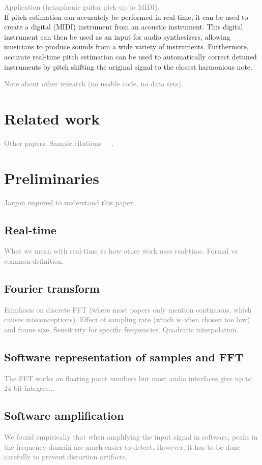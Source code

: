 \documentclass[10pt,twocolumn]{article}
\begin{document}
\textcolor{gray}{Application (hexaphonic guitar pick-up to MIDI).}\\
If pitch estimation can accurately be performed in real-time, it can be used to create a digital (MIDI) instrument from an acoustic instrument. This digital instrument can then be used as an input for audio synthesizers, allowing musicians to produce sounds from a wide variety of instruments. Furthermore, accurate real-time pitch estimation can be used to automatically correct detuned instruments by pitch shifting the original signal to the closest harmonious note.

\textcolor{gray}{Note about other research (no usable code, no data sets).}


\section{Related work}
\textcolor{gray}{Other papers. Sample citations~\cite{mono}~\cite{window}~\cite{twotimes}.}


\section{Preliminaries}
\textcolor{gray}{Jargon required to understand this paper.}

\subsection{Real-time}
\textcolor{gray}{What we mean with real-time vs how other work uses real-time. Formal vs common definition.}

\subsection{Fourier transform}
\textcolor{gray}{Emphasis on discrete FFT (where most papers only mention continuous, which causes misconceptions). Effect of sampling rate (which is often chosen too low) and frame size. Sensitivity for specific frequencies. Quadratic interpolation.}

\subsection{Software representation of samples and FFT}
\textcolor{gray}{The FFT works on floating point numbers but most audio interfaces give up to 24 bit integers...}

\subsection{Software amplification}
\textcolor{gray}{We found empirically that when amplifying the input signal in software, peaks in the frequency domain are much easier to detect. However, it has to be done carefully to prevent distortion artifacts.}
\end{document}
